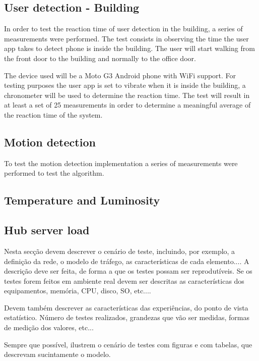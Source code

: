 \subsection{User detection - Building}

In order to test the reaction time of user detection in the building, a series of measurements
were performed. The test consists in observing the time the user app takes to detect phone is inside the building. The user will start walking from the front door to the building and normally to the office door.

The device used will be a Moto G3 Android phone with WiFi support.
For testing purposes the user app is set to vibrate when it is inside the building, a chronometer will be used to determine the reaction time. The test will result in at least a set of 25 measurements in order to determine a meaningful average of the reaction time of the system.



\subsection{Motion detection}

To test the motion detection implementation a series of measurements were performed to test the algorithm. 


\subsection{Temperature and Luminosity}

\subsection{Hub server load}





Nesta secção devem descrever o cenário de teste, incluindo, por exemplo, a
definição da rede, o modelo de tráfego, as características de cada elemento....
A descrição deve ser feita, de forma a que os testes possam ser reprodutíveis.
Se os testes forem feitos em ambiente real devem ser descritas as características
dos equipamentos, memória, CPU, disco, SO, etc....

Devem também descrever as características das experiências, do ponto de vista
estatístico. Número de testes realizados, grandezas que vão ser medidas, formas de
medição dos valores, etc...

Sempre que possível, ilustrem o cenário de testes com figuras e com tabelas, que
descrevam sucintamente o modelo.

